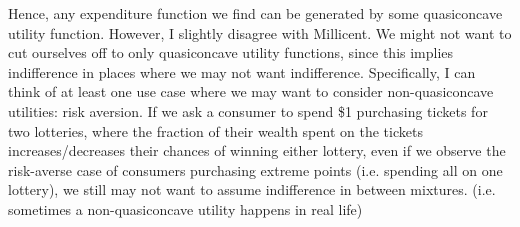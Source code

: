\documentclass[10pt,letter]{article}
\begin{document}
Hence, any expenditure function we find can be generated by some quasiconcave utility function. However, I slightly disagree with Millicent. We might not want to cut ourselves off to only quasiconcave utility functions, since this implies indifference in places where we may not want indifference. Specifically, I can think of at least one use case where we may want to consider non-quasiconcave utilities: risk aversion. If we ask a consumer to spend \$1 purchasing tickets for two lotteries, where the fraction of their wealth spent on the tickets increases/decreases their chances of winning either lottery, even if we observe the risk-averse case of consumers purchasing extreme points (i.e. spending all on one lottery), we still may not want to assume indifference in between mixtures. (i.e. sometimes a non-quasiconcave utility happens in real life)
\end{document}
